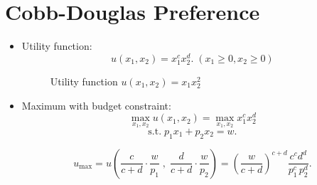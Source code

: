 \documentclass[
12pt, %
a4paper, %
onecolumn, %
portrait %
]{article}
\begin{document}
\section{Cobb-Douglas Preference}

\begin{itemize}
	\item Utility function:
	\[
	u(x_1,x_2)=x_1^cx_2^d.\;(x_1\ge0,x_2\ge 0)
	\]
	
	\begin{figure}[H]
		\centering
		\caption{Utility function $u(x_1,x_2)=x_1x_2^{2}$}
		\label{Fig.lable}
	\end{figure}
	
	\item Maximum with budget constraint:
	\[
	\max_{x_1,x_2} u(x_1,x_2)=\max_{x_1,x_2}x_1^cx_2^d
	\]
	\[
	\text{s.t.}\;p_1x_1+p_2x_2=w.
	\]
	
	\[
	u_{\max}=u\left(\frac{c}{c+d}\cdot\frac{w}{p_1}\;,\;\frac{d}{c+d}\cdot\frac{w}{p_2}\right)=\left(\frac{w}{c+d}\right)^{c+d}\frac{c^cd^d}{p_1^c\,p_2^d}.
	\]
	

\end{itemize}
\end{document}
